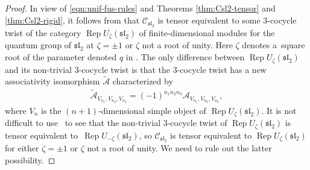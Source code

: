 \documentclass[pdftex]{sigma}
\numberwithin{equation}{section}
\theoremstyle{definition}
\begin{document}
\begin{proof}
In view of \eqref{eqn:unif-fus-rules} and Theorems \ref{thm:Csl2-tensor} and \ref{thm:Csl2-rigid}, it follows from \cite[Theorem $A_\infty$]{KaWe} that $\mathcal{C}_{\mathfrak{sl}_2}$ is tensor equivalent to some $3$-cocycle twist of the category $\operatorname{Rep} U_\zeta(\mathfrak{sl}_2)$ of finite-dimensional modules for the quantum group of $\mathfrak{sl}_2$ at $\zeta=\pm 1$ or $\zeta$ not a root of unity. Here $\zeta$ denotes a~square root of the parameter denoted $q$ in \cite{KaWe}. The only difference between $\operatorname{Rep} U_\zeta(\mathfrak{sl}_2)$ and its non-trivial $3$-cocycle twist is that the $3$-cocycle twist has a new associativity isomorphism $\widetilde{\mathcal{A}}$ characterized by
\begin{gather}\label{eqn:3-cocycle-assoc}
\widetilde{\mathcal{A}}_{V_{n_1},V_{n_2},V_{n_3}} =(-1)^{n_1n_2n_3}\mathcal{A}_{V_{n_1},V_{n_2},V_{n_3}},
\end{gather}
where $V_n$ is the $(n+1)$-dimensional simple object of $\operatorname{Rep} U_\zeta(\mathfrak{sl}_2)$. It is not difficult to use~\cite[Theorem $A_{\infty}$]{KaWe} to see that the non-trivial $3$-cocycle twist of $\operatorname{Rep} U_\zeta(\mathfrak{sl}_2)$ is tensor equivalent to~$\operatorname{Rep} U_{-\zeta}(\mathfrak{sl}_2)$, so $\mathcal{C}_{\mathfrak{sl}_2}$ is tensor equivalent to $\operatorname{Rep} U_\zeta(\mathfrak{sl}_2)$ for either $\zeta=\pm 1$ or $\zeta$ not a root of unity. We need to rule out the latter possibility.


\end{proof}
\end{document}
